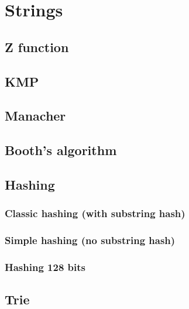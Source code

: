 \newpage
\section{Strings}

\subsection{Z function}

\subsection{KMP}


\subsection{Manacher}


\subsection{Booth's algorithm}


\subsection{Hashing}
\subsubsection{Classic hashing (with substring hash)}

\newpage
\subsubsection{Simple hashing (no substring hash)}

\newpage
\subsubsection{Hashing 128 bits}


\subsection{Trie}

\newpage
